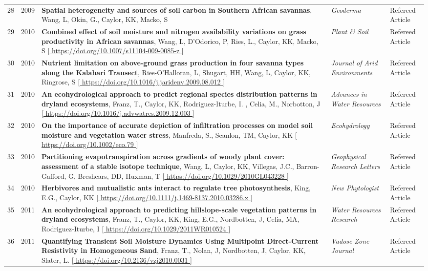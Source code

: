 \begin{supertabular}{lcp{8.25cm}p{4.75cm}p{1.75cm}}
28 & 2009 & {\bf Spatial heterogeneity and sources of soil carbon in Southern African savannas}, Wang, L, Okin, G., Caylor, KK, Macko, S  & \emph{ Geoderma } & Refereed Article\\
29 & 2010 & {\bf Combined effect of soil moisture and nitrogen availability variations on grass productivity in African savannas}, Wang, L, D'Odorico, P, Ries, L., Caylor, KK, Macko, S [\url{ https://doi.org/10.1007/s11104-009-0085-z }] & \emph{ Plant \& Soil } & Refereed Article\\
30 & 2010 & {\bf Nutrient limitation on above-ground grass production in four savanna types along the Kalahari Transect}, Ries-O'Halloran, L, Shugart, HH, Wang, L, Caylor, KK, Ringrose, S [\url{ https://doi.org/10.1016/j.jaridenv.2009.08.012 }] & \emph{ Journal of Arid Environments } & Refereed Article\\
31 & 2010 & {\bf An ecohydrological approach to  predict regional species distribution patterns in dryland ecosystems}, Franz, T., Caylor, KK, Rodriguez-Iturbe, I. , Celia, M., Norbotton, J [\url{ https://doi.org/10.1016/j.advwatres.2009.12.003 }] & \emph{ Advances in Water Resources } & Refereed Article\\
32 & 2010 & {\bf On the importance of accurate depiction of infiltration processes on model soil moisture and vegetation water stress}, Manfreda, S., Scanlon, TM, Caylor, KK [\url{ https://doi.org/10.1002/eco.79 }] & \emph{ Ecohydrology } & Refereed Article\\
33 & 2010 & {\bf Partitioning evapotranspiration across gradients of woody plant cover: assessment of a stable isotope technique}, Wang, L, Caylor, KK, Villegas, J.C., Barron-Gafford, G, Breshears, DD, Huxman, T [\url{ https://doi.org/10.1029/2010GL043228 }] & \emph{ Geophysical Research Letters } & Refereed Article\\
34 & 2010 & {\bf Herbivores and mutualistic ants interact to regulate tree photosynthesis}, King, E.G., Caylor, KK [\url{ https://doi.org/10.1111/j.1469-8137.2010.03286.x }] & \emph{ New Phytologist } & Refereed Article\\
35 & 2011 & {\bf An ecohydrological approach to predicting hillslope-scale vegetation patterns in dryland ecosystems}, Franz, T., Caylor, KK, King, E.G., Nordbotten, J, Celia, MA, Rodriguez-Iturbe, I [\url{ https://doi.org/10.1029/2011WR010524 }] & \emph{ Water Resources Research } & Refereed Article\\
36 & 2011 & {\bf Quantifying Transient Soil Moisture Dynamics Using Multipoint Direct-Current Resistivity in Homogeneous Sand}, Franz, T., Nolan, J, Nordbotten, J, Caylor, KK, Slater, L. [\url{ https://doi.org/10.2136/vzj2010.0031 }] & \emph{ Vadose Zone Journal } & Refereed Article\\

\end{supertabular}
